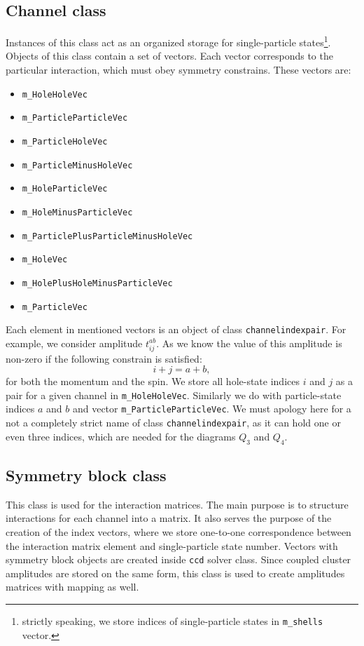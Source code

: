 \documentclass[twoside,english]{uiofysmaster}
\newcommand{\classname}[1]{\texttt{#1}}
\begin{document}
\subsection{Channel class}\label{channelsection}
Instances of this class act as an organized storage for single-particle states\footnote{strictly speaking, we store indices of single-particle states in \classname{m_shells} vector.}. 
Objects of this class contain a set of vectors. Each vector corresponds to the particular interaction, which must obey symmetry constrains. These vectors are:
\begin{itemize}
\item \classname{m_HoleHoleVec}
\item \classname{m_ParticleParticleVec}
\item \classname{m_ParticleHoleVec}
\item \classname{m_ParticleMinusHoleVec}
\item \classname{m_HoleParticleVec}
\item \classname{m_HoleMinusParticleVec}
\item \classname{m_ParticlePlusParticleMinusHoleVec}
\item \classname{m_HoleVec}
\item \classname{m_HolePlusHoleMinusParticleVec}
\item \classname{m_ParticleVec}
\end{itemize}
Each element in mentioned vectors is an object of class \classname{channelindexpair}. For example, we consider amplitude $t_{ij}^{ab}$. As we know the value of this amplitude is non-zero if the following constrain is satisfied:
\begin{equation}
i + j = a + b,
\end{equation} 										
for both the momentum and the spin. We store all hole-state indices $i$ and $j$ as a pair for a given channel in \classname{m_HoleHoleVec}. Similarly we do with particle-state indices $a$ and $b$ and vector \classname{m_ParticleParticleVec}. We must apology here for a not a completely strict name of class  \classname{channelindexpair}, as it can hold one or even three indices, which are needed for the diagrams $Q_3$ and $Q_4$.

\subsection{Symmetry block class}\label{symblocksection}
This class is used for the interaction matrices. The main purpose is to structure interactions for each channel into a matrix. It also serves the purpose of the creation of the index vectors, where we store one-to-one correspondence between the interaction matrix element and single-particle state number.
Vectors with symmetry block objects are created inside \classname{ccd} solver class.
Since coupled cluster amplitudes are stored on the same form, this class is used to create amplitudes matrices with mapping as well.
\end{document}
